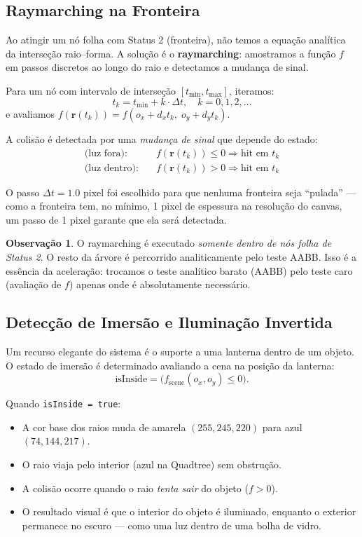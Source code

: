 \documentclass[11pt,a4paper]{article}
\theoremstyle{plain}
\theoremstyle{definition}
\newtheorem{remark}[theorem]{Observação}
\newcommand{\vv}[1]{\mathbf{#1}}
\begin{document}
\subsection{Raymarching na Fronteira}
\label{subsec:raymarch}

Ao atingir um nó folha com Status 2 (fronteira), não temos a equação analítica
da interseção raio--forma. A solução é o \textbf{raymarching}: amostramos a
função $f$ em passos discretos ao longo do raio e detectamos a mudança de sinal.

Para um nó com intervalo de interseção $[t_{\min}, t_{\max}]$, iteramos:
\[
    t_k = t_{\min} + k \cdot \Delta t, \quad k = 0, 1, 2, \ldots
\]
e avaliamos $f(\vv{r}(t_k)) = f(o_x + d_x t_k,\; o_y + d_y t_k)$.

A colisão é detectada por uma \emph{mudança de sinal} que depende do estado:
\begin{align*}
    \text{(luz fora):} & \quad f(\vv{r}(t_k)) \leq 0 
        \Rightarrow \text{hit em } t_k \\
    \text{(luz dentro):} & \quad f(\vv{r}(t_k)) > 0
        \Rightarrow \text{hit em } t_k
\end{align*}

O passo $\Delta t = 1.0$ pixel foi escolhido para que nenhuma fronteira seja
``pulada'' --- como a fronteira tem, no mínimo, 1 pixel de espessura na
resolução do canvas, um passo de 1 pixel garante que ela será detectada.

\begin{remark}
O raymarching é executado \emph{somente dentro de nós folha de Status 2}. O
resto da árvore é percorrido analiticamente pelo teste AABB. Isso é a essência
da aceleração: trocamos o teste analítico barato (AABB) pelo teste caro
(avaliação de $f$) apenas onde é absolutamente necessário.
\end{remark}

\subsection{Detecção de Imersão e Iluminação Invertida}
\label{subsec:imersao}

Um recurso elegante do sistema é o suporte a uma lanterna dentro de um objeto.
O estado de imersão é determinado avaliando a cena na posição da lanterna:
\[
    \text{isInside} = \bigl( f_{\text{scene}}(o_x, o_y) \leq 0 \bigr).
\]

Quando \texttt{isInside = true}:
\begin{itemize}
    \item A cor base dos raios muda de amarela $(255, 245, 220)$ para azul $(74, 144, 217)$.
    \item O raio viaja pelo interior (azul na Quadtree) sem obstrução.
    \item A colisão ocorre quando o raio \emph{tenta sair} do objeto ($f > 0$).
    \item O resultado visual é que o interior do objeto é iluminado, enquanto o
    exterior permanece no escuro --- como uma luz dentro de uma bolha de vidro.
\end{itemize}
\end{document}
